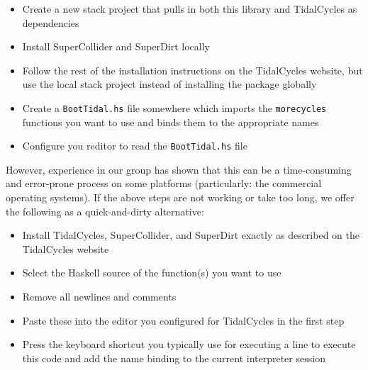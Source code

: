 \begin{itemize}
  \item Create a new stack project that pulls in both this library and TidalCycles as dependencies
  \item Install SuperCollider and SuperDirt locally
  \item Follow the rest of the installation instructions on the TidalCycles website, but use the local stack project instead of installing the package globally
  \item Create a \verb|BootTidal.hs| file somewhere which imports the \verb|morecycles| functions you want to use and binds them to the appropriate names
  \item Configure you reditor to read the \verb|BootTidal.hs| file
\end{itemize}

However, experience in our group has shown that this can be a time-consuming and error-prone process on some platforms (particularly: the commercial operating systems).
If the above steps are not working or take too long, we offer the following as a quick-and-dirty alternative:

\begin{itemize}
  \item Install TidalCycles, SuperCollider, and SuperDirt exactly as described on the TidalCycles website
  \item Select the Haskell source of the function(s) you want to use
  \item Remove all newlines and comments
  \item Paste these into the editor you configured for TidalCycles in the first step
  \item Press the keyboard shortcut you typically use for executing a line to execute this code and add the name binding to the current interpreter session
\end{itemize}
